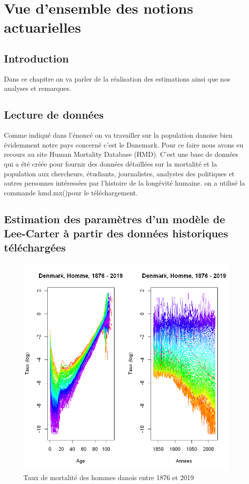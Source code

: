 \chapter{Vue d'ensemble des notions actuarielles}
\section*{Introduction}
Dans ce chapitre on va parler de la réalisation des estimations ainsi que nos analyses et remarques.
\section{Lecture de données}
Comme indiqué dans l’énoncé on va travailler sur la population danoise bien évidemment notre pays concerné c’est le Danemark. Pour ce faire nous avons eu recours au site Human Mortality Database (HMD). C’est une base de données qui a été créée pour fournir des données détaillées sur la mortalité et la population aux chercheurs, étudiants, journalistes,
analystes des politiques et autres personnes intéressées par l’histoire de la longévité humaine.
on a utilisé la commande hmd.mx()pour le téléchargement. 

\section{Estimation des paramètres d’un modèle de Lee-Carter à partir des données historiques téléchargées}

\begin{figure}[!htb]
 \caption{Taux de mortalité des hommes danois entre 1876 et 2019}
    \centering
    \includegraphics[scale =0.7]{output_7_0.png}
\end{figure}

